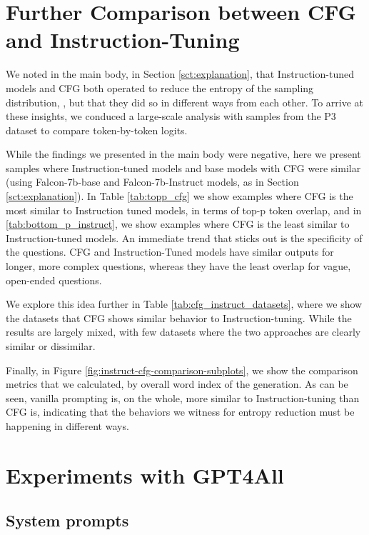 \documentclass{article}
\begin{document}
\FloatBarrier


\section{Further Comparison between CFG and Instruction-Tuning}
\label{app:instruction-tuning-comparison}

We noted in the main body, in Section \ref{sct:explanation}, that Instruction-tuned models and CFG both operated to reduce the entropy of the sampling distribution, , but that they did so in different ways from each other. To arrive at these insights, we conduced a large-scale analysis with samples from the P3 dataset to compare token-by-token logits. 

While the findings we presented in the main body were negative, here we present samples where Instruction-tuned models and base models with CFG were similar (using Falcon-7b-base and Falcon-7b-Instruct models, as in Section \ref{sct:explanation}). In Table \ref{tab:topp_cfg} we show examples where CFG is the most similar to Instruction tuned models, in terms of top-p token overlap, and in \ref{tab:bottom_p_instruct}, we show examples where CFG is the least similar to Instruction-tuned models. An immediate trend that sticks out is the specificity of the questions. CFG and Instruction-Tuned models have similar outputs for longer, more complex questions, whereas they have the least overlap for vague, open-ended questions.

We explore this idea further in Table \ref{tab:cfg_instruct_datasets}, where we show the datasets that CFG shows similar behavior to Instruction-tuning. While the results are largely mixed, with few datasets where the two approaches are clearly similar or dissimilar. 

Finally, in Figure \ref{fig:instruct-cfg-comparison-subplots}, we show the comparison metrics that we calculated, by overall word index of the generation. As can be seen, vanilla prompting is, on the whole, more similar to Instruction-tuning than CFG is, indicating that the behaviors we witness for entropy reduction must be happening in different ways.

\FloatBarrier

\section{Experiments with GPT4All}
\label{sec:prompts}

\subsection{System prompts}
\end{document}
